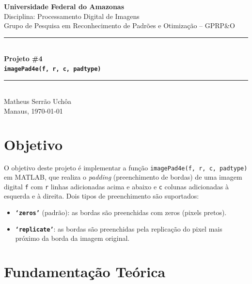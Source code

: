 \documentclass[12pt,a4paper]{article}
\begin{document}

\begin{center}
  {\Large\bfseries Universidade Federal do Amazonas}\\[4pt]
  {\large Disciplina: Processamento Digital de Imagens}\\[2pt]
  {\large Grupo de Pesquisa em Reconhecimento de Padrões e Otimização -- GPRP\&O}\\[12pt]
  \rule{\linewidth}{1.5pt}\\[6pt]
  {\LARGE\bfseries Projeto \#4}\\[4pt]
  {\Large\bfseries \texttt{imagePad4e(f, r, c, padtype)}}\\[6pt]
  \rule{\linewidth}{1.5pt}\\[10pt]
  {\large Matheus Serr\~ao Uch\^oa}\\[2pt]
  {\normalsize Manaus, \today}
\end{center}

\vspace{6mm}

\section{Objetivo}

O objetivo deste projeto é implementar a função \texttt{imagePad4e(f, r, c,
padtype)} em MATLAB, que realiza o \emph{padding} (preenchimento de bordas) de
uma imagem digital \texttt{f} com \texttt{r} linhas adicionadas acima e abaixo
e \texttt{c} colunas adicionadas à esquerda e à direita. Dois tipos de
preenchimento são suportados:

\begin{itemize}
  \item \textbf{\texttt{`zeros'}} (padrão): as bordas são preenchidas com
        zeros (pixels pretos).
  \item \textbf{\texttt{`replicate'}}: as bordas são preenchidas pela
        replicação do pixel mais próximo da borda da imagem original.
\end{itemize}

\section{Fundamentação Teórica}
\end{document}
